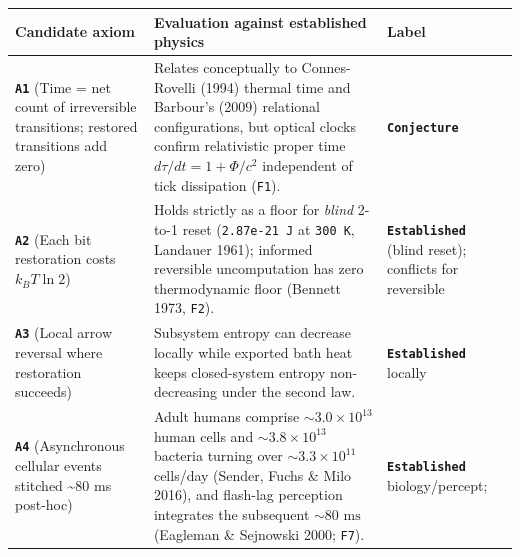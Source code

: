 \documentclass[10pt,letterpaper]{article}
\newcounter{none}
\begin{document}
{\def\LTcaptype{none} %
{\footnotesize\setlength{\tabcolsep}{3.8pt}\renewcommand{\arraystretch}{1.15}
\begin{longtable}[]{@{}
  >{\raggedright\arraybackslash}p{}
  >{\raggedright\arraybackslash}p{}
  >{\raggedright\arraybackslash}p{}@{}}
\toprule\noalign{}
\begin{minipage}[b]{\linewidth}\raggedright
\textbf{Candidate axiom}
\end{minipage} & \begin{minipage}[b]{\linewidth}\raggedright
\textbf{Evaluation against established physics}
\end{minipage} & \begin{minipage}[b]{\linewidth}\raggedright
\textbf{Label}
\end{minipage} \\
\midrule\noalign{}
\endhead
\bottomrule\noalign{}
\endlastfoot
\textbf{\texttt{A1}} (Time = net count of irreversible transitions;
restored transitions add zero) & Relates conceptually to Connes-Rovelli
(1994) thermal time and Barbour's (2009) relational configurations, but
optical clocks confirm relativistic proper time
\(d\tau/dt = 1 + \Phi/c^2\) independent of tick dissipation
(\texttt{F1}). & \textbf{\texttt{Conjecture}} \\
\textbf{\texttt{A2}} (Each bit restoration costs \(k_B T \ln 2\)) &
Holds strictly as a floor for \emph{blind} 2-to-1 reset
(\texttt{2.\allowbreak{}87e-\allowbreak{}21\ J} at \texttt{300\ K}, Landauer 1961); informed
reversible uncomputation has zero thermodynamic floor (Bennett 1973,
\texttt{F2}). & \textbf{\texttt{Established}} (blind reset); conflicts
for reversible \\
\textbf{\texttt{A3}} (Local arrow reversal where restoration succeeds) &
Subsystem entropy can decrease locally while exported bath heat keeps
closed-system entropy non-decreasing under the second law. &
\textbf{\texttt{Established}} locally \\
\textbf{\texttt{A4}} (Asynchronous cellular events stitched
\textasciitilde80 ms post-hoc) & Adult humans comprise
\(\sim 3.0 \times 10^{13}\) human cells and \(\sim 3.8 \times 10^{13}\)
bacteria turning over \(\sim 3.3 \times 10^{11}\) cells/day (Sender,
Fuchs \& Milo 2016), and flash-lag perception integrates the subsequent
\(\sim 80\text{ ms}\) (Eagleman \& Sejnowski 2000; \texttt{F7}). &
\textbf{\texttt{Established}} biology/percept;

\end{longtable}}}
\end{document}

